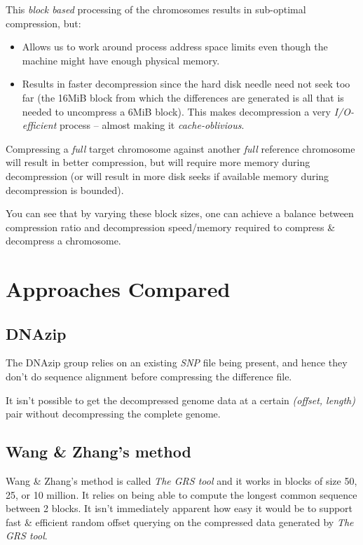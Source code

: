 \documentclass[11pt]{article}
\begin{document}
This \textit{block based} processing of the chromosomes results in
sub-optimal compression, but:
\begin{itemize}
\item Allows us to work around process address space limits even
  though the machine might have enough physical memory.
\item Results in faster decompression since the hard disk needle need
  not seek too far (the 16MiB block from which the differences are
  generated is all that is needed to uncompress a 6MiB block). This
  makes decompression a very \textit{I/O-efficient} process -- almost
  making it \textit{cache-oblivious}.
\end{itemize}

Compressing a \textit{full} target chromosome against another
\textit{full} reference chromosome will result in better compression,
but will require more memory during decompression (or will result in
more disk seeks if available memory during decompression is bounded).

You can see that by varying these block sizes, one can achieve a
balance between compression ratio and decompression speed/memory
required to compress \& decompress a chromosome.


\section{Approaches Compared}

\subsection{DNAzip}

The DNAzip group relies on an existing \textit{SNP} file being
present, and hence they don't do sequence alignment before compressing
the difference file.

It isn't possible to get the decompressed genome data at a certain
\textit{(offset, length)} pair without decompressing the complete
genome.

\subsection{Wang \& Zhang's method}

Wang \& Zhang's method is called \textit{The GRS tool} and it works in
blocks of size 50, 25, or 10 million. It relies on being able to
compute the longest common sequence between 2 blocks. It isn't
immediately apparent how easy it would be to support fast \& efficient
random offset querying on the compressed data generated by \textit{The
  GRS tool}.
\end{document}
